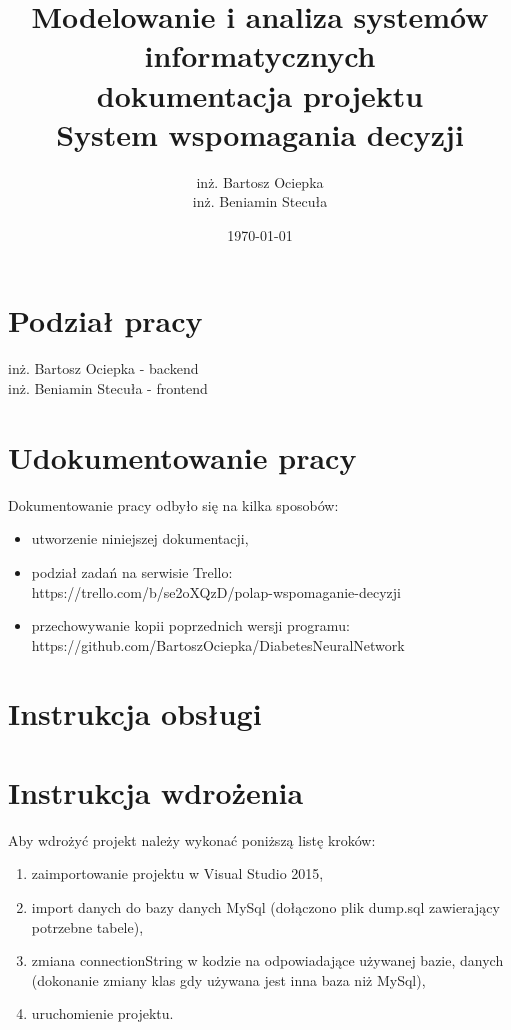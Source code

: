 \documentclass[12pt,a4paper]{article}
\begin{document}
	
	\title{Modelowanie i analiza systemów informatycznych\\
		\bigskip
		\small{dokumentacja projektu \\
			System wspomagania decyzji}}
	\author{inż. Bartosz Ociepka\\
			inż. Beniamin Stecuła}
	\date{\today}
	
	\maketitle







	\newpage
\section*{Podział pracy}
	inż. Bartosz Ociepka - backend\\
	inż. Beniamin Stecuła - frontend
	
\section*{Udokumentowanie pracy}
	Dokumentowanie pracy odbyło się na kilka sposobów:
	\begin{itemize}
		\item utworzenie niniejszej dokumentacji,
		\item podział zadań na serwisie Trello:\\
				https://trello.com/b/se2oXQzD/polap-wspomaganie-decyzji
		\item przechowywanie kopii poprzednich wersji programu:\\
				https://github.com/BartoszOciepka/DiabetesNeuralNetwork
	\end{itemize}
	
\section*{Instrukcja obsługi}
	
\section*{Instrukcja wdrożenia}

	Aby wdrożyć projekt należy wykonać poniższą listę kroków:
	
	\begin{enumerate}
		\item zaimportowanie projektu w Visual Studio 2015,
		\item import danych do bazy danych MySql (dołączono plik dump.sql zawierający potrzebne tabele),
		\item zmiana connectionString w kodzie na odpowiadające używanej bazie,
		danych (dokonanie zmiany klas gdy używana jest inna baza niż MySql),
		\item uruchomienie projektu.
	\end{enumerate}
	
\end{document}
